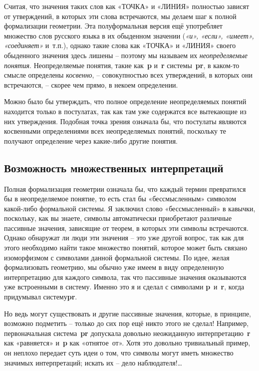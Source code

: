 \documentclass[../main.tex]{subfiles}
\begin{document}
Считая, что значения таких слов как «ТОЧКА» и «ЛИНИЯ» полностью зависят от утверждений, в которых эти слова встречаются, мы делаем шаг к полной формализации геометрии. Эта полуформальная версия ещё употребляет множество слов русского языка в их обыденном значении (\emph{«и», «если», «имеет», «соединяет»} и~т.п.), однако такие слова как «ТОЧКА» и «ЛИНИЯ» своего обыденного значения здесь лишены \--- поэтому мы называем их \emph{неопределяемые понятия}. Неопределяемые понятия, такие как~\textbf{p} и~\textbf{r} системы~\textbf{pr}, в каком-то смысле определены \emph{косвенно}, \--- совокупностью всех утверждений, в которых они встречаются, \--- скорее чем прямо, в некоем определении.

Можно было бы утверждать, что полное определение неопределяемых понятий находится только в постулатах, так как там уже содержатся все вытекающие из них утверждения. Подобная точка зрения означала бы, что постулаты являются косвенными определениями всех неопределяемых понятий, поскольку те получают определение через какие-либо другие понятия.


\subsection{Возможность множественных интерпретаций}

Полная формализация геометрии означала бы, что каждый термин превратился бы в неопределяемое понятие, то есть стал бы «бессмысленным» символом какой-либо формальной системы. Я заключил слово «бессмысленный» в кавычки, поскольку, как вы знаете, символы автоматически приобретают различные пассивные значения, зависящие от теорем, в которых эти символы встречаются. Однако обнаружат ли люди эти значения \--- это уже другой вопрос, так как для этого необходимо найти такое множество понятий, которое может быть связано изоморфизмом с символами данной формальной системы. По идее, желая формализовать геометрию, мы обычно уже имеем в виду определенную интерпретацию для каждого символа, так что пассивные значения оказываются уже встроенными в систему. Именно это я и сделал с символами \textbf{p}~и~\textbf{r}, когда придумывал систему\textbf{pr}.

Но ведь могут существовать и другие пассивные значения, которые, в принципе, возможно подметить \--- только до сих пор ещё никто этого не сделал! Например, первоначальная система~\textbf{pr} допускала довольно неожиданную интерпретацию~\textbf{r} как «равняется» и~\textbf{p} как «отнятое~от». Хотя это довольно тривиальный пример, он неплохо передает суть идеи о том, что символы могут иметь множество значимых интерпретаций; искать их \--- дело наблюдателя!\ldots{}
\end{document}
